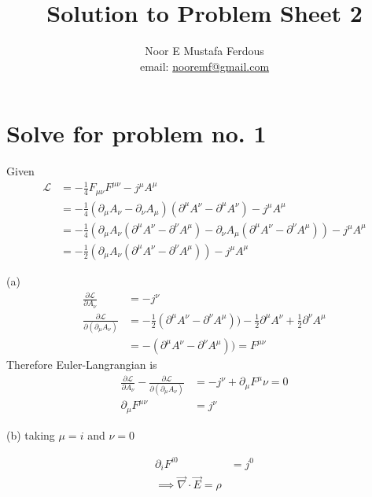 \documentclass[12pt, letterpaper]{article}
\title{Solution to Problem Sheet 2}
\author{Noor E Mustafa Ferdous\\ email: \href{mailto:nooremf@gmail.com}{nooremf@gmail.com} }
\date{}
\newcommand*{\1}{\hspace{1pt}}
\begin{document}
\maketitle

\section*{Solve for problem no. 1}

Given
\begin{align*}
    \mathcal{L} &= -\frac{1}{4}F_{\mu \nu} F^{\mu \nu} - j^{\mu} A^{\mu} \\
    &= -\frac{1}{4}(\partial_{\mu}A_{\nu} - \partial_{\nu}A_{\mu})(\partial^{\mu} A^{\nu} - \partial^{\mu} A^{\nu})  - j^{\mu} A^{\mu}\\
    &= -\frac{1}{4}(\partial_{\mu} A_{\nu}(\partial^{\mu} A^{\nu} - \partial^{\nu} A^{\mu})  - \partial_{\nu} A_{\mu}(\partial^{\mu} A^{\nu} - \partial^{\nu} A^{\mu})) - j^{\mu} A^{\mu}\\
    &= -\frac{1}{2}(\partial_{\mu} A_{\nu}(\partial^{\mu} A^{\nu} - \partial^{\nu} A^{\mu})) - j^{\mu} A^{\mu}
\end{align*}

(a)
\begin{align*}
    \frac{\partial \mathcal{L}}{\partial A_{\nu}} &= - j^{\nu} \\
    \frac{\partial \mathcal{L}}{\partial (\partial _{\mu} A_{\nu})} &= -\frac{1}{2}(\partial^{\mu} A^{\nu} - \partial^{\nu} A^{\mu})) -\frac{1}{2}\partial^{\mu} A^{\nu} + \frac{1}{2}\partial^{\nu} A^{\mu} \\ 
    &= -(\partial^{\mu} A^{\nu} - \partial^{\nu} A^{\mu})) = F^{\mu \nu}
\end{align*}
Therefore Euler-Langrangian is 
\begin{align*}
    \frac{\partial \mathcal{L}}{\partial A_{\nu}} - \frac{\partial \mathcal{L}}{\partial (\partial _{\mu} A_{\nu})} &= -j^{\nu} + \partial_{\mu} F^{\mu}{\nu} = 0 \\ 
    \partial_{\mu} F^{\mu \nu} &= j^{\nu}  
\end{align*}

(b) 
taking $\mu = i$ and $\nu = 0$

\begin{align*}
    \partial _{i} F^{i 0} &= j^{0} \\ 
    \implies \overrightarrow{\nabla} \cdot \overrightarrow{E} = \rho
\end{align*}
\end{document}
